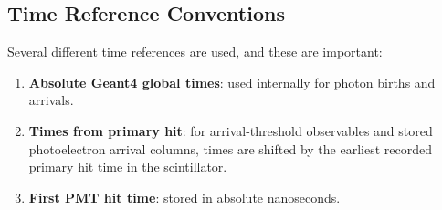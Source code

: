 \subsection{Time Reference Conventions}
Several different time references are used, and these are important:
\begin{enumerate}[label=\arabic*.]
\item \textbf{Absolute Geant4 global times}: used internally for photon births and arrivals.
\item \textbf{Times from primary hit}: for arrival-threshold observables and stored photoelectron arrival columns, times are shifted by the earliest recorded primary hit time in the scintillator.
\item \textbf{First PMT hit time}: stored in absolute nanoseconds.
\end{enumerate}


